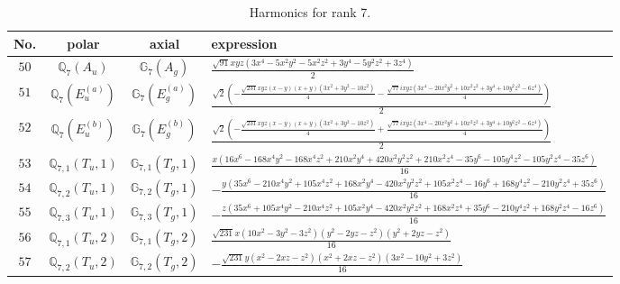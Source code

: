 \documentclass[fleqn,8pt,landscape]{jsarticle}
\begin{document}
\begin{table}[ht!]
\begin{center}
\caption{Harmonics for rank 7.}
\renewcommand{\arraystretch}{1.3}
\begin{tabular}{cccl} \hline \hline
No. & polar & axial & expression \\ \hline
$ 50 $ & $ \mathbb{Q}_{7}(A_{u}) $ & $ \mathbb{G}_{7}(A_{g}) $ & $ \frac{\sqrt{91} x y z \left(3 x^{4} - 5 x^{2} y^{2} - 5 x^{2} z^{2} + 3 y^{4} - 5 y^{2} z^{2} + 3 z^{4}\right)}{2} $ \\
$ 51 $ & $ \mathbb{Q}_{7}(E_{u}^{(a)}) $ & $ \mathbb{G}_{7}(E_{g}^{(a)}) $ & $ \frac{\sqrt{2} \left(- \frac{\sqrt{231} x y z \left(x - y\right) \left(x + y\right) \left(3 x^{2} + 3 y^{2} - 10 z^{2}\right)}{4} - \frac{\sqrt{77} i x y z \left(3 x^{4} - 20 x^{2} y^{2} + 10 x^{2} z^{2} + 3 y^{4} + 10 y^{2} z^{2} - 6 z^{4}\right)}{4}\right)}{2} $ \\
$ 52 $ & $ \mathbb{Q}_{7}(E_{u}^{(b)}) $ & $ \mathbb{G}_{7}(E_{g}^{(b)}) $ & $ \frac{\sqrt{2} \left(- \frac{\sqrt{231} x y z \left(x - y\right) \left(x + y\right) \left(3 x^{2} + 3 y^{2} - 10 z^{2}\right)}{4} + \frac{\sqrt{77} i x y z \left(3 x^{4} - 20 x^{2} y^{2} + 10 x^{2} z^{2} + 3 y^{4} + 10 y^{2} z^{2} - 6 z^{4}\right)}{4}\right)}{2} $ \\
$ 53 $ & $ \mathbb{Q}_{7,1}(T_{u},1) $ & $ \mathbb{G}_{7,1}(T_{g},1) $ & $ \frac{x \left(16 x^{6} - 168 x^{4} y^{2} - 168 x^{4} z^{2} + 210 x^{2} y^{4} + 420 x^{2} y^{2} z^{2} + 210 x^{2} z^{4} - 35 y^{6} - 105 y^{4} z^{2} - 105 y^{2} z^{4} - 35 z^{6}\right)}{16} $ \\
$ 54 $ & $ \mathbb{Q}_{7,2}(T_{u},1) $ & $ \mathbb{G}_{7,2}(T_{g},1) $ & $ - \frac{y \left(35 x^{6} - 210 x^{4} y^{2} + 105 x^{4} z^{2} + 168 x^{2} y^{4} - 420 x^{2} y^{2} z^{2} + 105 x^{2} z^{4} - 16 y^{6} + 168 y^{4} z^{2} - 210 y^{2} z^{4} + 35 z^{6}\right)}{16} $ \\
$ 55 $ & $ \mathbb{Q}_{7,3}(T_{u},1) $ & $ \mathbb{G}_{7,3}(T_{g},1) $ & $ - \frac{z \left(35 x^{6} + 105 x^{4} y^{2} - 210 x^{4} z^{2} + 105 x^{2} y^{4} - 420 x^{2} y^{2} z^{2} + 168 x^{2} z^{4} + 35 y^{6} - 210 y^{4} z^{2} + 168 y^{2} z^{4} - 16 z^{6}\right)}{16} $ \\
$ 56 $ & $ \mathbb{Q}_{7,1}(T_{u},2) $ & $ \mathbb{G}_{7,1}(T_{g},2) $ & $ \frac{\sqrt{231} x \left(10 x^{2} - 3 y^{2} - 3 z^{2}\right) \left(y^{2} - 2 y z - z^{2}\right) \left(y^{2} + 2 y z - z^{2}\right)}{16} $ \\
$ 57 $ & $ \mathbb{Q}_{7,2}(T_{u},2) $ & $ \mathbb{G}_{7,2}(T_{g},2) $ & $ - \frac{\sqrt{231} y \left(x^{2} - 2 x z - z^{2}\right) \left(x^{2} + 2 x z - z^{2}\right) \left(3 x^{2} - 10 y^{2} + 3 z^{2}\right)}{16} $ \\

\end{tabular}
\end{center}
\end{table}
\end{document}

